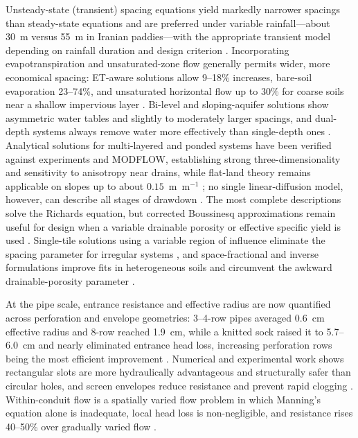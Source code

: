 Unsteady-state (transient) spacing equations yield markedly narrower spacings
than steady-state equations and are preferred under variable rainfall---about
30~m versus 55~m in Iranian paddies---with the appropriate transient model
depending on rainfall duration and design criterion
\parencite{OOSTERBAAN1988,DarziNaftchally2014,Moshayedi2020,Pali2014,Nédélec2010}.
Incorporating evapotranspiration and unsaturated-zone flow generally permits
wider, more economical spacing: ET-aware solutions allow 9--18\% increases,
bare-soil evaporation 23--74\%, and unsaturated horizontal flow up to 30\% for
coarse soils near a shallow impervious layer
\parencite{NIKAM1992,Singh2010,Upadhyaya2000,AbdelFattah2005,Yousfi2014}.
Bi-level and sloping-aquifer solutions show asymmetric water tables and
slightly to moderately larger spacings, and dual-depth systems always remove
water more effectively than single-depth ones
\parencite{Verma1998,Kankarej2023,Upadhyaya2013,Hartani2001,Kirkham1997}.
Analytical solutions for multi-layered and ponded systems have been verified
against experiments and MODFLOW, establishing strong three-dimensionality and
sensitivity to anisotropy near drains, while flat-land theory remains
applicable on slopes up to about $0.15$~m~m$^{-1}$
\parencite{Chakrabarti2020,Sarmah2015,SHARMA1991,Afruzi2014,Lin2025,CHU1977,FIPPS1989,LORRE1994};
no single linear-diffusion model, however, can describe all stages of drawdown
\parencite{Kacimov2000}. The most complete descriptions solve the Richards
equation, but corrected Boussinesq approximations remain useful for design when
a variable drainable porosity or effective specific yield is used
\parencite{TANG1977,Xin2016c,VANDELEUR1959,SINGH1980,Bouarfa2000}. Single-tile
solutions using a variable region of influence eliminate the spacing parameter
for irregular systems \parencite{Cooke2001}, and space-fractional and inverse
formulations improve fits in heterogeneous soils and circumvent the awkward
drainable-porosity parameter
\parencite{FathAllah2025,Mehdinejadiani2013,Mehdinejadiani2020,Mehdinejadiani2022,Samani2007,Chahar2010,SINGH1992,KUMAR1994,Onyejekwe1999,Bahceci2008}.

At the pipe scale, entrance resistance and effective radius are now quantified
across perforation and envelope geometries: 3--4-row pipes averaged 0.6~cm
effective radius and 8-row reached 1.9~cm, while a knitted sock raised it to
5.7--6.0~cm and nearly eliminated entrance head loss, increasing perforation
rows being the most efficient improvement
\parencite{Ghane2022b,Ghane2022}. Numerical and experimental work shows
rectangular slots are more hydraulically advantageous and structurally safer
than circular holes, and screen envelopes reduce resistance and prevent rapid
clogging
\parencite{Gaj2020,Oyarce2017,Gaj2021,Stuyt2006}. Within-conduit flow is a
spatially varied flow problem in which Manning's equation alone is inadequate,
local head loss is non-negligible, and resistance rises 40--50\% over
gradually varied flow
\parencite{Bayat2011,Graber2004,Kouchakzadeh2011,Nédélec2008,Wu2022,Gupta2019}.


